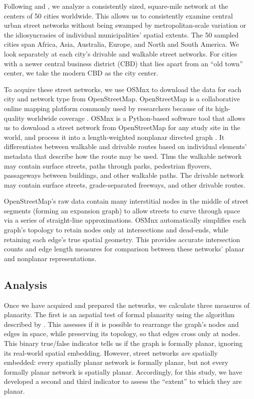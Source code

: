 \documentclass[Afour,doublespace,sageh,times]{sagej}
\begin{document}
Following \citet{jacobs_great_1995} and \citet{cardillo_structural_2006}, we analyze a consistently sized, square-mile network at the centers of 50 cities worldwide. This allows us to consistently examine central urban street networks without being swamped by metropolitan-scale variation or the idiosyncrasies of individual municipalities' spatial extents. The 50 sampled cities span Africa, Asia, Australia, Europe, and North and South America. We look separately at each city's drivable and walkable street networks. For cities with a newer central business district (CBD) that lies apart from an \enquote{old town} center, we take the modern CBD as the city center.

To acquire these street networks, we use OSMnx to download the data for each city and network type from OpenStreetMap. OpenStreetMap is a collaborative online mapping platform commonly used by researchers because of its high-quality worldwide coverage \citep{haklay_how_2010,jokar_arsanjani_openstreetmap_2015}. OSMnx is a Python-based software tool that allows us to download a street network from OpenStreetMap for any study site in the world, and process it into a length-weighted nonplanar directed graph \citep{boeing_osmnx:_2017}. It differentiates between walkable and drivable routes based on individual elements' metadata that describe how the route may be used. Thus the walkable network may contain surface streets, paths through parks, pedestrian flyovers, passageways between buildings, and other walkable paths. The drivable network may contain surface streets, grade-separated freeways, and other drivable routes.

OpenStreetMap's raw data contain many interstitial nodes in the middle of street segments (forming an expansion graph) to allow streets to curve through space via a series of straight-line approximations. OSMnx automatically simplifies each graph's topology to retain nodes only at intersections and dead-ends, while retaining each edge's true spatial geometry. This provides accurate intersection counts and edge length measures for comparison between these networks' planar and nonplanar representations.

\subsection{Analysis}

Once we have acquired and prepared the networks, we calculate three measures of planarity. The first is an aspatial test of formal planarity using the algorithm described by \citet{boyer_subgraph_2012}. This assesses if it is possible to rearrange the graph's nodes and edges in space, while preserving its topology, so that edges cross only at nodes. This binary true/false indicator tells us if the graph is formally planar, ignoring its real-world spatial embedding. However, street networks \emph{are} spatially embedded: every spatially planar network is formally planar, but not every formally planar network is spatially planar. Accordingly, for this study, we have developed a second and third indicator to assess the \enquote{extent} to which they are planar.
\end{document}
